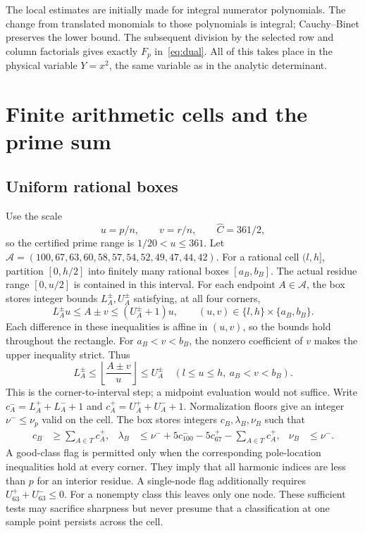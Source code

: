The local estimates are initially made for integral numerator polynomials.
The change from translated monomials to those polynomials is integral;
Cauchy--Binet preserves the lower bound. The subsequent division by the
selected row and column factorials gives exactly $F_p$ in~\eqref{eq:dual}.
All of this takes place in the physical variable $Y=x^2$, the same variable
as in the analytic determinant.

\section{Finite arithmetic cells and the prime sum}\label{sec:prime}
\subsection{Uniform rational boxes}
Use the scale
\[
 u=p/n,\qquad v=r/n,\qquad \widehat C=361/2,
\]
so the certified prime range is $1/20<u\le361$. Let
$\mathcal A=(100,67,63,60,58,57,54,52,49,47,44,42)$.
For a rational cell $(l,h]$, partition $[0,h/2]$ into finitely many
rational boxes $[a_B,b_B]$. The actual residue range $[0,u/2]$ is contained
in this interval. For each endpoint $A\in\mathcal A$, the box stores integer
bounds $L_A^\pm,U_A^\pm$ satisfying, at all four corners,
\begin{equation}\label{eq:corner}
 L_A^\pm u\le A\pm v\le(U_A^\pm+1)u,
 \qquad (u,v)\in\{l,h\}\times\{a_B,b_B\}.
\end{equation}
Each difference in these inequalities is affine in $(u,v)$, so the bounds
hold throughout the rectangle. For $a_B<v<b_B$, the nonzero coefficient
of $v$ makes the upper inequality strict. Thus
\[
 L_A^\pm\le\left\lfloor\frac{A\pm v}{u}\right\rfloor\le U_A^\pm
 \quad(l\le u\le h,\ a_B<v<b_B).
\]
This is the corner-to-interval step; a midpoint evaluation would not suffice.
Write $c_A^-=L_A^++L_A^-+1$ and $c_A^+=U_A^++U_A^-+1$.
Normalization floors give an integer $\nu^-\le\nu_p$ valid on the cell.
The box stores integers $c_B,\lambda_B,\nu_B$ such that
\begin{align*}
 c_B&\ge\sum_{A\in T}c_A^+,&
 \lambda_B&\le\nu^-+5c_{100}^- -5c_{67}^+-\sum_{A\in T}c_A^+,
 &\nu_B&\le\nu^-.
\end{align*}
A good-class flag is permitted only when the corresponding pole-location
inequalities hold at every corner. They imply that all harmonic indices
are less than $p$ for an interior residue. A single-node flag additionally
requires $U_{63}^++U_{63}^-\le0$. For a nonempty class this leaves only one
node. These sufficient tests may sacrifice sharpness but never presume
that a classification at one sample point persists across the cell.

